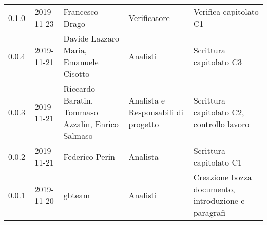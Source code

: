{\begin{longtable}{ c c  C{4cm}  C{3cm} C{4cm}}
0.1.0 & 2019-11-23 & Francesco Drago & Verificatore & Verifica capitolato C1 \\

0.0.4 & 2019-11-21 & Davide Lazzaro Maria, Emanuele Cisotto & Analisti & Scrittura capitolato C3 \\

0.0.3 & 2019-11-21 & Riccardo Baratin, Tommaso Azzalin, Enrico Salmaso & Analista e Responsabili di progetto & Scrittura capitolato C2, controllo lavoro  \\

0.0.2 & 2019-11-21 & Federico Perin & Analista & Scrittura capitolato C1  \\
		
0.0.1 & 2019-11-20 & gbteam & Analisti & Creazione bozza documento, introduzione e paragrafi \\
		
\end{longtable}
}
